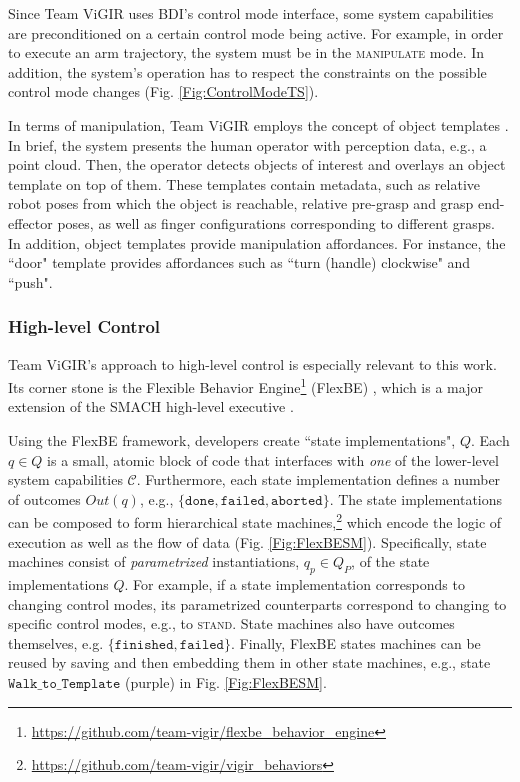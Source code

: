 Since Team ViGIR uses BDI's control mode interface, some system capabilities are preconditioned on a certain control mode being active.
For example, in order to execute an arm trajectory, the system must be in the \textsc{manipulate} mode.
In addition, the system's operation has to respect the constraints on the possible control mode changes (Fig. \ref{Fig:ControlModeTS}).

In terms of manipulation, Team ViGIR employs the concept of object templates \cite{Alberto2014Humanoids}.
In brief, the system presents the human operator with perception data, e.g., a point cloud.
Then, the operator detects objects of interest and overlays an object template on top of them.
These templates contain metadata, such as relative robot poses from which the object is reachable, relative pre-grasp and grasp end-effector poses, as well as finger configurations corresponding to different grasps.
In addition, object templates provide manipulation affordances.
For instance, the ``door" template provides affordances such as ``turn (handle) clockwise" and ``push".

\subsubsection*{High-level Control}\label{S:FlexBE}
Team ViGIR's approach to high-level control is especially relevant to this work.
Its corner stone is the Flexible Behavior Engine\footnote{\scriptsize{\url{https://github.com/team-vigir/flexbe_behavior_engine}}} (FlexBE) \cite{Philipp2013Bsc, Philipp2015MSc}, which is a major extension of the SMACH high-level executive \cite{SMACH2010RAM}.

Using the FlexBE framework, developers create ``state implementations", $Q$. %
Each $q \in Q$ is a small, atomic block of code that interfaces with \emph{one} of the lower-level system capabilities $\mathcal{C}$.
Furthermore, each state implementation defines a number of outcomes $Out(q)$, e.g., $\{ \mathtt{done}, \mathtt{failed}, \mathtt{aborted} \}$.
The state implementations can be composed to form hierarchical state machines,\footnote{\scriptsize{\url{https://github.com/team-vigir/vigir_behaviors}}}
 which encode the logic of execution as well as the flow of data (Fig. \ref{Fig:FlexBESM}).
Specifically, state machines consist of \emph{parametrized} instantiations, $q_p \in Q_P$, of the state implementations $Q$.
For example, if a state implementation corresponds to changing control modes, its parametrized counterparts correspond to changing to specific control modes, e.g., to \textsc{stand}.
State machines also have outcomes themselves, e.g. $\{ \mathtt{finished}, \mathtt{failed} \}$.
Finally, FlexBE states machines can be reused by saving and then embedding them in other state machines, e.g., state $\mathtt{Walk\_to\_Template}$ (purple) in Fig. \ref{Fig:FlexBESM}.

